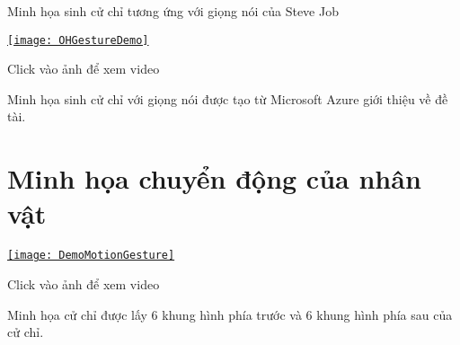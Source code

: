 Minh họa sinh cử chỉ tương ứng với giọng nói của Steve Job


{
	\begin{center}
		\centering
		\href{https://youtu.be/yLwXdm7UgPE}{%
			\texttt{[image: OHGestureDemo]}}
		
		{\tiny Click vào ảnh để xem video}
	\end{center}
}

Minh họa sinh cử chỉ với giọng nói được tạo từ Microsoft Azure giới thiệu về đề tài.

\section{Minh họa chuyển động của nhân vật}

\begin{center}
{
	\centering
	\href{https://www.youtube.com/watch?v=9IIIZP3EJLg}{%
	\texttt{[image: DemoMotionGesture]}}
	
	{\tiny Click vào ảnh để xem video}
}
\end{center}
Minh họa cử chỉ được lấy 6 khung hình phía trước và 6 khung hình phía sau của cử chỉ.